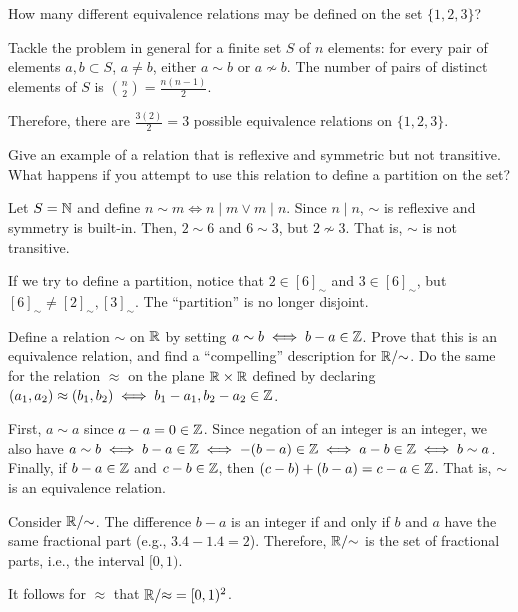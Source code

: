 \documentclass[notes,tikz]{agony}
\begin{document}
\begin{xca}
  How many different equivalence relations may be defined on the set $\{1,2,3\}$?
\end{xca}
\begin{sol}
  Tackle the problem in general for a finite set $S$ of $n$ elements:
  for every pair of elements $a, b \subset S$, $a \neq b$,
  either $a \sim b$ or $a \nsim b$.
  The number of pairs of distinct elements of $S$ is $\binom{n}{2} = \frac{n(n-1)}{2}$.

  Therefore, there are $\frac{3(2)}{2} = 3$ possible equivalence relations on $\{1,2,3\}$.
\end{sol}

\begin{xca}
  Give an example of a relation that is reflexive and symmetric but not transitive.
  What happens if you attempt to use this relation to define a partition on the set?
\end{xca}
\begin{sol}
  Let $S = \mathbb{N}$ and define $n \sim m \iff n \mid m \lor m \mid n$.
  Since $n \mid n$, $\sim$ is reflexive and symmetry is built-in.
  Then, $2 \sim 6$ and $6 \sim 3$, but $2 \nsim 3$.
  That is, $\sim$ is not transitive.

  If we try to define a partition, notice that $2 \in [6]_\sim$ and $3 \in [6]_\sim$,
  but $[6]_\sim \neq [2]_\sim, [3]_\sim$.
  The ``partition'' is no longer disjoint.
\end{sol}

\begin{xca}
  Define a relation $\sim$ on $\mathbb{R}$ by setting $a \sim b \iff b-a \in \mathbb{Z}$.
  Prove that this is an equivalence relation, and find a ``compelling'' description for $\mathbb{R}/{\sim}$.
  Do the same for the relation $\approx$ on the plane $\mathbb{R} \times \mathbb{R}$
  defined by declaring $(a_1, a_2) \approx (b_1, b_2) \iff b_1-a_1, b_2-a_2 \in \mathbb{Z}$.
\end{xca}
\begin{sol}
  First, $a \sim a$ since $a-a = 0 \in \mathbb{Z}$.
  Since negation of an integer is an integer, we also have
  $a \sim b \iff b-a \in \mathbb{Z} \iff -(b-a) \in \mathbb{Z} \iff a-b \in \mathbb{Z} \iff b \sim a$.
  Finally, if $b-a \in \mathbb{Z}$ and $c-b \in \mathbb{Z}$, then $(c-b)+(b-a) = c-a \in \mathbb{Z}$.
  That is, $\sim$ is an equivalence relation.

  Consider $\mathbb{R}/{\sim}$. The difference $b-a$ is an integer if and only if
  $b$ and $a$ have the same fractional part (e.g., $3.4 - 1.4 = 2$).
  Therefore, $\mathbb{R}/{\sim}$ is the set of fractional parts, i.e., the interval $[0,1)$.

  It follows for $\approx$ that $\mathbb{R}/{\approx} = [0,1)^2$.
\end{sol}
\end{document}
